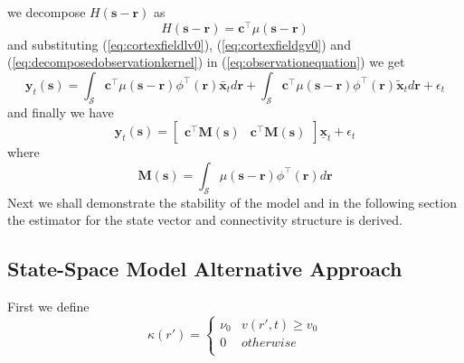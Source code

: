 \documentclass[onecolumn,draftcls]{IEEEtran}
\begin{document}
 we decompose $ H(\mathbf s-\mathbf r)$ as
 \begin{equation}
  H(\mathbf s-\mathbf r)= \mathbf c^{\top}\mu(\mathbf s-\mathbf r)
\label{eq:decomposedobservationkernel}
\end{equation}
and substituting  (\ref{eq:cortexfieldlv0}), (\ref{eq:cortexfieldgv0}) and (\ref{eq:decomposedobservationkernel}) in (\ref{eq:observationequation}) we get
\begin{equation}
 \mathbf y_t(\mathbf s)=\int_{\mathcal S}\mathbf c^{\top}\mu(\mathbf s-\mathbf r)\phi^{\top}(\mathbf r)\bar{\mathbf x}_{t}d\mathbf r+\int_{\mathcal S}\mathbf c^{\top}\mu(\mathbf s-\mathbf r)\phi^{\top}(\mathbf r)\tilde{\mathbf x}_{t}d\mathbf r+\epsilon_t
\end{equation}
and finally we have
\begin{equation}
\mathbf y_t(\mathbf s)= \begin{bmatrix}\mathbf c^{\top}\mathbf M(\mathbf s)&\mathbf c^{\top}\mathbf M(\mathbf s)\end{bmatrix}\underline{\mathbf x}_t+\epsilon_t
\end{equation}
where
\begin{equation}
 \mathbf M(\mathbf s)=\int_{\mathcal S}\mu(\mathbf s-\mathbf r)\phi^{\top}(\mathbf r)d\mathbf r
\end{equation}
Next we shall demonstrate the stability of the model and in the following section the estimator for the state vector and connectivity structure is derived.

\subsection{State-Space Model Alternative Approach}
First we define
\begin{equation}\label{DefineKappa}
\kappa \left( r' \right) = \left\{ {\begin{array}{*{20}{c}}
   {{\nu _0}} & {v\left( {r',t} \right) \ge {v_0}}  \\
   0 & {otherwise}  \\
\end{array}} \right.
\end{equation}
\end{document}
